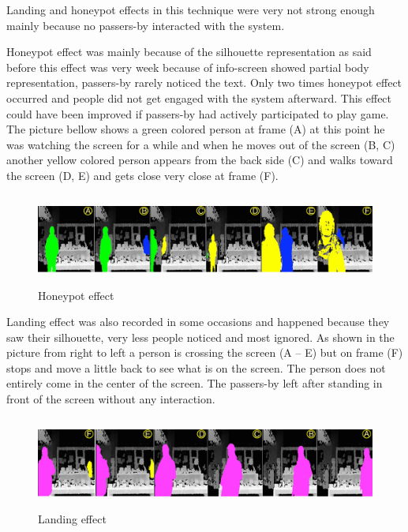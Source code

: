 Landing and honeypot effects in this technique were very not strong enough mainly because no passers-by interacted with the system.

Honeypot effect was mainly because of the silhouette representation as said before this effect was very week because of info-screen showed partial body representation, passers-by rarely noticed the text. Only two times honeypot effect occurred and people did not get engaged with the system afterward. This effect could have been improved if passers-by had actively participated to play game.  The picture bellow shows a green colored person at frame (A) at this point he was watching the screen for a while and when he moves out of the screen (B, C) another yellow colored person appears from the back side (C) and walks toward the screen (D, E) and gets close very close at frame (F).

\begin{minipage}{0.95\textwidth}
\begin{flushright}
\begin{figure}[H]
    \centering
    \includegraphics[width=\textwidth,height=30mm]{Figures/8/mobile_inter_findings/effects/honeypot}
    \caption{Honeypot effect}
    \label{fig:mobile_honeypoteffect}
\end{figure}
\end{flushright}
\end{minipage}


Landing effect was also recorded in some occasions and happened because they saw their silhouette, very less people noticed and most ignored. As shown in the picture from right to left a person is crossing the screen (A – E) but on frame (F) stops and move a little back to see what is on the screen. The person does not entirely come in the center of the screen. The passers-by left after standing in front of the screen without any interaction.

\begin{minipage}{0.95\textwidth}
\begin{flushright}
\begin{figure}[H]
    \centering
    \includegraphics[width=\textwidth,height=30mm]{Figures/8/mobile_inter_findings/effects/landing}
    \caption{Landing effect}
    \label{fig:mobile_landingeffect}
\end{figure}
\end{flushright}
\end{minipage}



